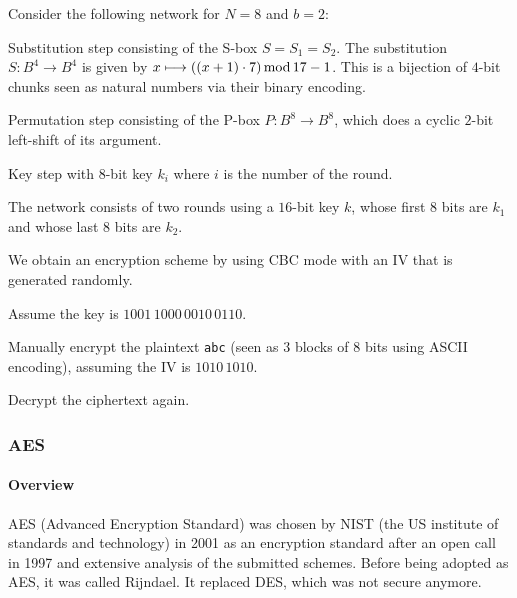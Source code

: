 \begin{exercise}\label{exc:sd:spn}
Consider the following network for $N=8$ and $b=2$:
\begin{compactenum}
 \item Substitution step consisting of the S-box $S=S_1=S_2$.
  The substitution $S:B^4\to B^4$ is given by $x\longmapsto ((x+1)\cdot 7)\mathop{\mathrm{mod}} 17-1$.
  This is a bijection of $4$-bit chunks seen as natural numbers via their binary encoding.
 \item Permutation step consisting of the P-box $P:B^8\to B^8$, which does a cyclic $2$-bit left-shift of its argument.
 \item Key step with $8$-bit key $k_i$ where $i$ is the number of the round.
\end{compactenum}
The network consists of two rounds using a $16$-bit key $k$, whose first $8$ bits are $k_1$ and whose last $8$ bits are $k_2$.

We obtain an encryption scheme by using CBC mode with an IV that is generated randomly.

Assume the key is $1001\,1000\,0010\,0110$.

Manually encrypt the plaintext \texttt{abc} (seen as $3$ blocks of $8$ bits using ASCII encoding), assuming the IV is $1010\,1010$.

Decrypt the ciphertext again.
\end{exercise}



\subsubsection{AES}

\paragraph{Overview}
AES (Advanced Encryption Standard) was chosen by NIST (the US institute of standards and technology) in 2001 as an encryption standard after an open call in 1997 and extensive analysis of the submitted schemes.
Before being adopted as AES, it was called Rijndael.
It replaced DES, which was not secure anymore.

